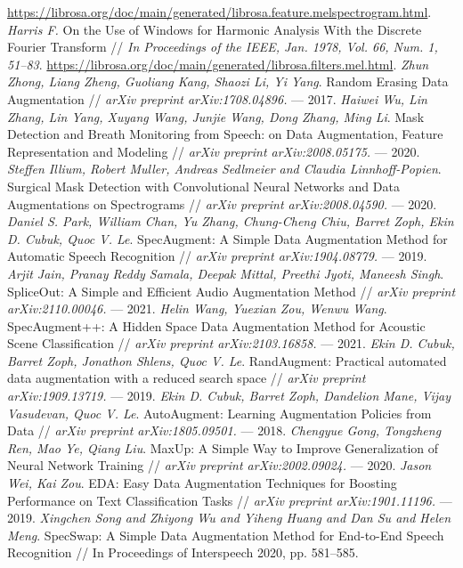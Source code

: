 \documentclass[12pt, fleqn]{article}
\begin{document}
\newpage
\begin{thebibliography}{3}
    \url{https://librosa.org/doc/main/generated/librosa.feature.melspectrogram.html}.
    \textit{Harris F.} On the Use of Windows for Harmonic Analysis With the Discrete Fourier Transform // \textit{In Proceedings of the IEEE, Jan. 1978, Vol. 66, Num. 1, 51--83}.
    \url{https://librosa.org/doc/main/generated/librosa.filters.mel.html}.
	\textit{Zhun Zhong, Liang Zheng, Guoliang Kang, Shaozi Li, Yi Yang}. Random Erasing Data Augmentation // \textit{arXiv preprint arXiv:1708.04896.} --- 2017.
	\textit{Haiwei Wu, Lin Zhang, Lin Yang, Xuyang Wang, Junjie Wang, Dong Zhang, Ming Li}. Mask Detection and Breath Monitoring from Speech: on Data Augmentation,
	Feature Representation and Modeling // \textit{arXiv preprint arXiv:2008.05175.} --- 2020.
	\textit{Steffen Illium, Robert Muller, Andreas Sedlmeier and Claudia Linnhoff-Popien}. Surgical Mask Detection with Convolutional Neural Networks and Data
	Augmentations on Spectrograms // \textit{arXiv preprint arXiv:2008.04590.} --- 2020.
	\textit{Daniel S. Park, William Chan, Yu Zhang, Chung-Cheng Chiu, Barret Zoph, Ekin D. Cubuk, Quoc V. Le}. SpecAugment: A Simple Data Augmentation Method
	for Automatic Speech Recognition // \textit{arXiv preprint arXiv:1904.08779.} --- 2019.
	\textit{Arjit Jain, Pranay Reddy Samala, Deepak Mittal, Preethi Jyoti, Maneesh Singh}. SpliceOut: A Simple and Efficient Audio Augmentation Method // \textit{arXiv preprint arXiv:2110.00046.} --- 2021.
	\textit{Helin Wang, Yuexian Zou, Wenwu Wang}. SpecAugment++: A Hidden Space Data Augmentation Method for Acoustic Scene Classification // \textit{arXiv preprint arXiv:2103.16858.} --- 2021.
	\textit{Ekin D. Cubuk, Barret Zoph, Jonathon Shlens, Quoc V. Le}. RandAugment: Practical automated data augmentation with a reduced search space // \textit{arXiv preprint arXiv:1909.13719.} --- 2019.
	\textit{Ekin D. Cubuk, Barret Zoph, Dandelion Mane, Vijay Vasudevan, Quoc V. Le}. AutoAugment: Learning Augmentation Policies from Data // \textit{arXiv preprint arXiv:1805.09501.} --- 2018.
	\textit{Chengyue Gong, Tongzheng Ren, Mao Ye, Qiang Liu}. MaxUp: A Simple Way to Improve Generalization of Neural Network Training // \textit{arXiv preprint arXiv:2002.09024.} --- 2020.
	\textit{Jason Wei, Kai Zou}. EDA: Easy Data Augmentation Techniques for Boosting Performance on Text Classification Tasks // \textit{arXiv preprint arXiv:1901.11196.} --- 2019.
	\textit{Xingchen Song and Zhiyong Wu and Yiheng Huang and Dan Su and Helen Meng}. SpecSwap: A Simple Data Augmentation Method for End-to-End Speech Recognition // In Proceedings of Interspeech 2020, pp. 581--585. 


\end{thebibliography}
\end{document}
